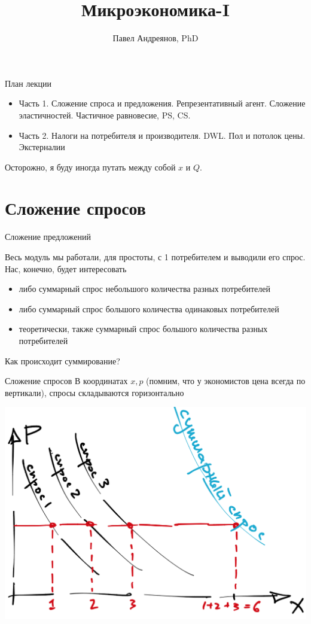 \documentclass{beamer}
\title{
Микроэкономика-I
}
\author{
Павел Андреянов, PhD
}
\begin{document}
\maketitle

\begin{frame}{План лекции}

\begin{itemize}
  \item Часть 1. Сложение спроса и предложения. Репрезентативный агент. Сложение эластичностей. Частичное равновесие, PS, CS.
  \item Часть 2. Налоги на потребителя и производителя. DWL. Пол и потолок цены.  Экстерналии
\end{itemize}

Осторожно, я буду иногда путать между собой $x$ и $Q$.
\end{frame}

\section{Сложение спросов}

\begin{frame}{Сложение предложений}

Весь модуль мы работали, для простоты, с 1 потребителем и выводили его спрос. Нас, конечно, будет интересовать 

\begin{itemize}
  \item либо суммарный спрос небольшого количества разных потребителей
  \item либо суммарный спрос большого количества одинаковых потребителей
  \item теоретически, также суммарный спрос большого количества разных потребителей
\end{itemize}

Как происходит суммирование?

\end{frame}

\begin{frame}{Сложение спросов}
В координатах $x,p$ (помним, что у экономистов цена всегда по вертикали), спросы \alert{складываются горизонтально}
    \begin{center}
     \includegraphics[width=.8\textwidth]{sumdemand}
     \end{center}
\end{frame}
\end{document}
